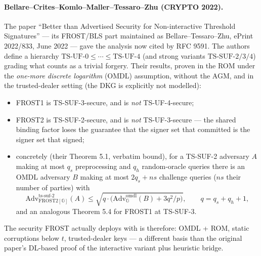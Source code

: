 \documentclass[11pt,a4paper]{article}
\theoremstyle{definition}
\newcommand{\G}{\mathbb{G}}
\begin{document}
\paragraph{Bellare--Crites--Komlo--Maller--Tessaro--Zhu (CRYPTO 2022).}
The paper ``Better than Advertised Security for Non-interactive
Threshold Signatures'' --- its FROST/BLS part maintained as
Bellare--Tessaro--Zhu, ePrint 2022/833, June 2022 --- gave the analysis
now cited by RFC 9591. The authors define a hierarchy
$\mathrm{TS\text{-}UF\text{-}0} \le \cdots \le
\mathrm{TS\text{-}UF\text{-}4}$ (and strong variants
$\mathrm{TS\text{-}SUF\text{-}2/3/4}$) grading what counts as a trivial
forgery. Their results, proven in the ROM under the \emph{one-more
discrete logarithm} (OMDL) assumption, without the AGM, and in the
trusted-dealer setting (the DKG is explicitly not modelled):
\begin{itemize}
\item FROST1 is TS-SUF-3-secure, and is \emph{not} TS-UF-4-secure;
\item FROST2 is TS-SUF-2-secure, and is \emph{not} TS-UF-3-secure ---
  the shared binding factor loses the guarantee that the signer set that
  committed is the signer set that signed;
\item concretely (their Theorem 5.1, verbatim bound), for a TS-SUF-2
  adversary $A$ making at most $q_s$ preprocessing and $q_h$
  random-oracle queries there is an OMDL adversary $B$ making at most
  $2 q_s + \mathit{ns}$ challenge queries ($\mathit{ns}$ their number of
  parties) with
  \[
  \mathrm{Adv}^{\mathrm{ts\text{-}suf\text{-}2}}_{\mathrm{FROST2}[\G]}(A)
  \le \sqrt{q \cdot \bigl(\mathrm{Adv}^{\mathrm{omdl}}_{\G}(B)
  + 3 q^2 / p \bigr)}, \qquad q = q_s + q_h + 1,
  \]
  and an analogous Theorem 5.4 for FROST1 at TS-SUF-3.
\end{itemize}
The security FROST actually deploys with is therefore: OMDL + ROM, static
corruptions below $t$, trusted-dealer keys --- a different basis than the
original paper's DL-based proof of the interactive variant plus heuristic
bridge.
\end{document}
